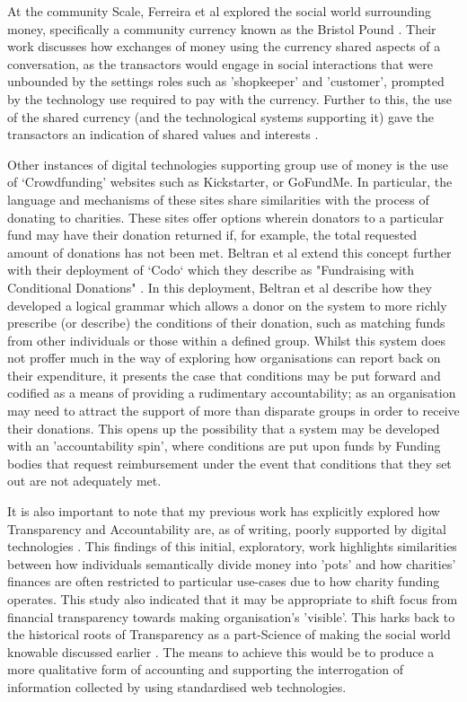 At the community Scale, Ferreira et al explored the social world surrounding money, specifically a community currency known as the Bristol Pound \cite{ferreira_spending_2015}. Their work discusses how exchanges of money using the currency shared aspects of a conversation, as the transactors would engage in social interactions that were unbounded by the settings roles such as 'shopkeeper' and 'customer', prompted by the technology use required to pay with the currency. Further to this, the use of the shared currency (and the technological systems supporting it) gave the transactors an indication of shared values and interests \cite{ferreira_spending_2015}.

Other instances of digital technologies supporting group use of money is the use of `Crowdfunding' websites such as Kickstarter, or GoFundMe. In particular, the language and mechanisms of these sites share similarities with the process of donating to charities. These sites offer options wherein donators to a particular fund may have their donation returned if, for example, the total requested amount of donations has not been met. Beltran et al extend this concept further with their deployment of `Codo` which they describe as "Fundraising with Conditional Donations" \cite{beltran_codo:_2015}. In this deployment, Beltran et al describe how they developed a logical grammar which allows a donor on the system to more richly prescribe (or describe) the conditions of their donation, such as matching funds from other individuals or those within a defined group. Whilst this system does not proffer much in the way of exploring how organisations can report back on their expenditure, it presents the case that conditions may be put forward and codified as a means of providing a rudimentary accountability; as an organisation may need to attract the support of more than disparate groups in order to receive their donations. This opens up the possibility that a system may be developed with an 'accountability spin', where conditions are put upon funds by Funding bodies that request reimbursement under the event that conditions that they set out are not adequately met.

It is also important to note that my previous work has explicitly explored how Transparency and Accountability are, as of writing, poorly supported by digital technologies \cite{marshall_accountable:_2016}. This findings of this initial, exploratory, work highlights similarities between how individuals semantically divide money into 'pots' and how charities' finances are often restricted to particular use-cases due to how charity funding operates. This study also indicated that it may be appropriate to shift focus from financial transparency towards making organisation's 'visible'. This harks back to the historical roots of Transparency as a part-Science of making the social world knowable discussed earlier \cite{hood_transparency_2006}. The means to achieve this would be to produce a more qualitative form of accounting and supporting the interrogation of information collected by using standardised web technologies.


